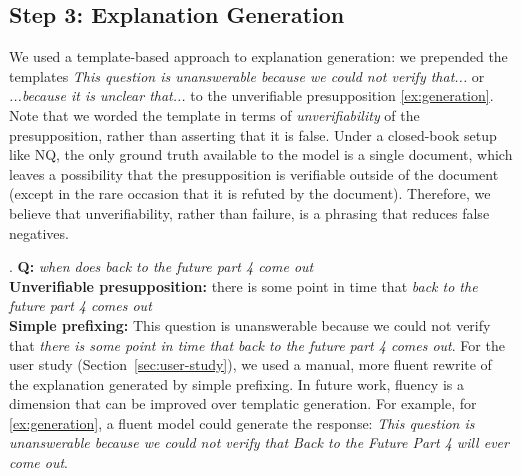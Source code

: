 \documentclass[11pt,a4paper]{article}
\begin{document}
\begin{table*}[t]
    \caption{Performance on NQ development set with ETC and ETC augmented with presupposition information. We compare our augmentation results against our own replication of \citet{ainslie2020etc} (first row).}
    \label{table:augmented-results}
\end{table*}

\subsection{Step 3: Explanation Generation}
\label{subsec:exp-generation}
We used a template-based approach to explanation generation: we prepended the templates \textit{This question is unanswerable because we could not verify that...} or \textit{...because it is unclear that...} to the unverifiable presupposition \ref{ex:generation}. Note that we worded the template in terms of \textit{unverifiability} of the presupposition, rather than asserting that it is false. Under a closed-book setup like NQ, the only ground truth available to the model is a single document, which leaves a possibility that the presupposition is verifiable outside of the document (except in the rare occasion that it is refuted by the document). Therefore, we believe that unverifiability, rather than failure, is a phrasing that reduces false negatives.

\ex. \label{ex:generation} \textbf{Q:} \textit{when does back to the future part 4 come out}\\
\textbf{Unverifiable presupposition:} there is some point in time that \textit{back to the future part 4 comes out}\\
\textbf{Simple prefixing:} This question is unanswerable because we could not verify that
                  \textit{there is some point in time that back to the future part 4 comes out}.
For the user study (Section~\ref{sec:user-study}), we used a manual, more fluent rewrite of the explanation generated by simple prefixing. In future work, fluency is a dimension that can be improved over templatic generation. For example, for \ref{ex:generation}, a fluent model could generate the response: \textit{This question is unanswerable because we could not verify that Back to the Future Part 4 will ever come out}.
\end{document}
